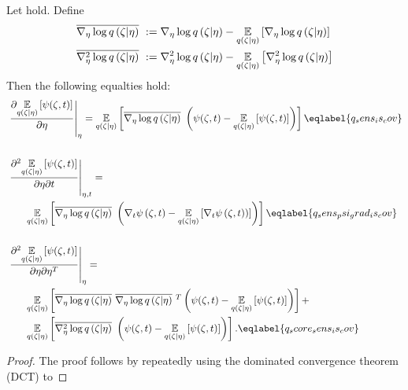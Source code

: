 \begin{lem}
%
Let  hold.  Define
%
\begin{align*}
%
\lqgradbar{\zeta \vert \eta} :={}& \lqgrad{\zeta \vert \eta}
  - \expect{\q(\zeta \vert \eta)}{\lqgrad{\zeta \vert \eta}} \\
\lqhessbar{\zeta \vert \eta} :={}& \lqhess{\zeta \vert \eta}
 - \expect{\q(\zeta \vert \eta)}{\lqhess{\zeta \vert \eta}} \\
%
\end{align*}
%
Then the following equalties hold:
%
\begin{align}
%
\MoveEqLeft
\fracat{\partial \expect{\q(\zeta \vert \eta)}
              {\psi(\zeta, \t)}}{\partial \eta}{\eta} ={}
\expect{\q(\zeta \vert \eta)}
       {\lqgradbar{\zeta \vert \eta} \left(
        \psi(\zeta,\t) - \expect{\q(\zeta \vert \eta)}{\psi(\zeta, \t)}
       \right)
       }\eqlabel{q_sens_is_cov}\\\nonumber\\
%
\MoveEqLeft
\fracat{\partial^2 \expect{\q(\zeta \vert \eta)}
      {\psi(\zeta, \t)}}{\partial \eta \partial \t}{\eta, \t} ={}\nonumber\\&
  \expect{\q(\zeta \vert \eta)}
         {\lqgradbar{\zeta \vert \eta} \left(
          \psigrad{\zeta,\t} - \expect{\q(\zeta \vert \eta)}{\psigrad{\zeta, \t})}
         \right)
         } \eqlabel{q_sens_psi_grad_is_cov} \\\nonumber\\
 \MoveEqLeft
 \fracat{\partial^2 \expect{\q(\zeta \vert \eta)}
       {\psi(\zeta, \t)}}{\partial \eta \partial \eta^T}{\eta} ={}
 \nonumber\\&
 \expect{\q(\zeta \vert \eta)}
        {\lqgradbar{\zeta \vert \eta} \lqgradbar{\zeta \vert \eta}^T
        \left(
         \psi(\zeta,\t) - \expect{\q(\zeta \vert \eta)}{\psi(\zeta, \t)}
        \right)
        } +
 \nonumber\\ &
 \expect{\q(\zeta \vert \eta)}{
        \lqhessbar{\zeta \vert \eta}
        \left(
         \psi(\zeta,\t) - \expect{\q(\zeta \vert \eta)}{\psi(\zeta, \t)}
        \right)
        }. \eqlabel{q_score_sens_is_cov}
%
\end{align}
%
\begin{proof}
%
The proof follows by repeatedly using the dominated convergence theorem (DCT) to

\end{proof}
\end{lem}

